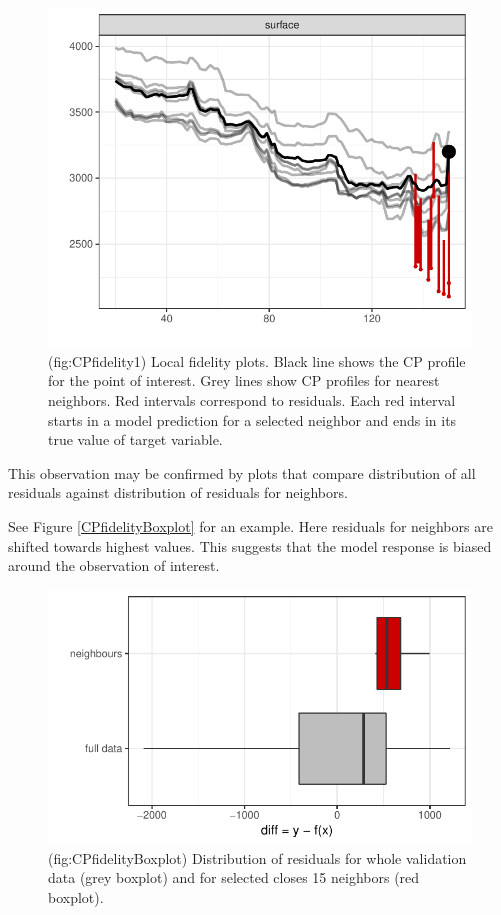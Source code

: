 \documentclass[]{krantz}
\theoremstyle{definition}
\theoremstyle{definition}
\theoremstyle{definition}
\theoremstyle{remark}
\begin{document}
\begin{figure}

{\centering \includegraphics[width=0.7\linewidth]{figure/cp_fidelity_1} 

}

\caption{(fig:CPfidelity1) Local fidelity plots. Black line shows the CP profile for the point of interest. Grey lines show CP profiles for nearest neighbors. Red intervals correspond to residuals. Each red interval starts in a model prediction for a selected neighbor and ends in its true value of target variable.}\label{fig:CPfidelity1}
\end{figure}

This observation may be confirmed by plots that compare distribution of
all residuals against distribution of residuals for neighbors.

See Figure \ref{CPfidelityBoxplot} for an example. Here residuals for
neighbors are shifted towards highest values. This suggests that the
model response is biased around the observation of interest.

\begin{figure}

{\centering \includegraphics[width=0.7\linewidth]{figure/cp_fidelity_boxplot} 

}

\caption{(fig:CPfidelityBoxplot) Distribution of residuals for whole validation data (grey boxplot) and for selected closes 15 neighbors (red boxplot).}\label{fig:CPfidelityBoxplot}
\end{figure}
\end{document}
